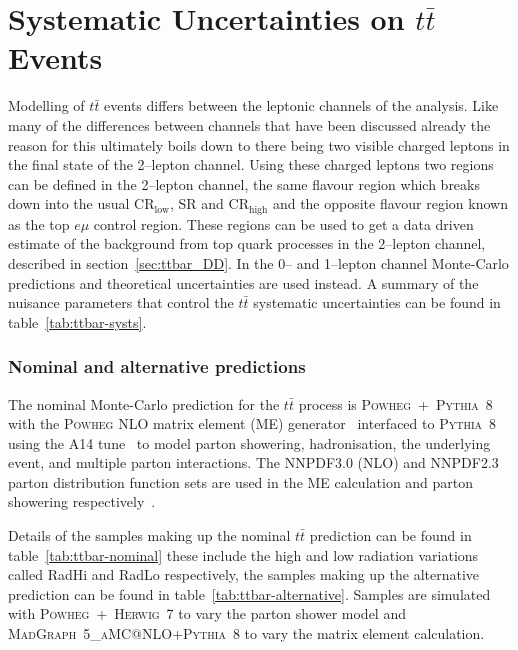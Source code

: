 \clearpage
\newpage

\section{Systematic Uncertainties on \texorpdfstring{$t\bar{t}$}{tt} Events}
\label{sec:ttbar-systs}
Modelling of $t\bar{t}$ events differs between the leptonic channels of the
analysis. Like many of the differences between channels that have been discussed
already the reason for this ultimately boils down to there being two visible
charged leptons in the final state of the 2--lepton channel. Using these charged
leptons two regions can be defined in the 2--lepton channel, the same flavour
region which breaks down into the usual CR$_{\text{low}}$, SR and
CR$_{\text{high}}$ and the opposite flavour region known as the top $e\mu$
control region. These regions can be used to get a data driven estimate of the
background from top quark processes in the 2--lepton channel, described in
section~\ref{sec:ttbar_DD}. In the 0-- and 1--lepton channel Monte-Carlo
predictions and theoretical uncertainties are used instead. A summary of the
nuisance parameters that control the $t\bar{t}$ systematic uncertainties can be
found in table~\ref{tab:ttbar-systs}.


\subsubsection{Nominal and alternative predictions}

The nominal Monte-Carlo prediction for the $t\bar{t}$ process is
\textsc{Powheg}~+~\textsc{Pythia}~8 with the \textsc{Powheg} NLO matrix element
(ME) generator~\cite{JHEP0709.2007.126,JHEP0411.2004.040} interfaced to
\textsc{Pythia}~8~\cite{Comp.Phys.Comm.191.159} using the A14
tune~\cite{ATL-PHYS-PUB-2014-021} to model parton showering, hadronisation,
the underlying event, and multiple parton interactions. The NNPDF3.0 (NLO) and
NNPDF2.3 parton distribution function sets are used in the ME calculation and
parton showering respectively~\cite{ATL-PHYS-PUB-2016-020}.

Details of the samples making up the nominal $t\bar{t}$ prediction can be found
in table~\ref{tab:ttbar-nominal} these include the high and low radiation
variations called  RadHi and RadLo respectively, the samples making up the
alternative prediction can be found in table~\ref{tab:ttbar-alternative}.
Samples are simulated with \textsc{Powheg}~+~\textsc{Herwig}~7 to vary the
parton shower model and \textsc{MadGraph}~5\textsc{\_aMC@NLO}+\textsc{Pythia}~8
to vary the matrix element calculation.

